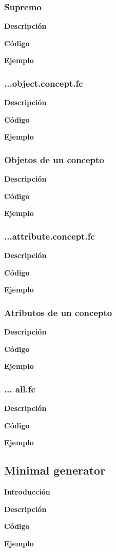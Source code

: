     \subsubsection{Supremo}

    
        \textbf{Descripci\'on}


        \textbf{C\'odigo}


        \textbf{Ejemplo}


    \subsubsection{...object.concept.fc}

    
        \textbf{Descripci\'on}


        \textbf{C\'odigo}


        \textbf{Ejemplo}


    \subsubsection{Objetos de un concepto}

    
        \textbf{Descripci\'on}


        \textbf{C\'odigo}


        \textbf{Ejemplo}


    \subsubsection{...attribute.concept.fc}

    
        \textbf{Descripci\'on}


        \textbf{C\'odigo}


        \textbf{Ejemplo}


    \subsubsection{Atributos de un concepto}

    
        \textbf{Descripci\'on}


        \textbf{C\'odigo}


        \textbf{Ejemplo}


    \subsubsection{... all.fc}

    
        \textbf{Descripci\'on}


        \textbf{C\'odigo}


        \textbf{Ejemplo}



\subsection{Minimal generator}


    \textbf{Introducci\'on}


    \textbf{Descripci\'on}


    \textbf{C\'odigo}


    \textbf{Ejemplo}